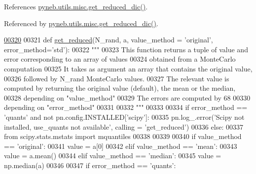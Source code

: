 References \hyperlink{misc_8py_source_l00370}{pyneb.\-utils.\-misc.\-get\-\_\-reduced\-\_\-dic()}.



Referenced by \hyperlink{misc_8py_source_l00370}{pyneb.\-utils.\-misc.\-get\-\_\-reduced\-\_\-dic()}.


\begin{DoxyCode}
\hypertarget{namespacepyneb_1_1utils_1_1misc_l00320}{}\hyperlink{namespacepyneb_1_1utils_1_1misc_ae69de9c9e8f8bde114b8edd326f3b993}{00320} 
00321 \textcolor{keyword}{def }\hyperlink{namespacepyneb_1_1utils_1_1misc_ae69de9c9e8f8bde114b8edd326f3b993}{get\_reduced}(N\_rand, a, value\_method = 'original', error\_method='std'):
00322     \textcolor{stringliteral}{"""}
00323 \textcolor{stringliteral}{    This function returns a tuple of value and error corresponding to an array of values }
00324 \textcolor{stringliteral}{        obtained from a MonteCarlo computation}
00325 \textcolor{stringliteral}{    It takes as argument an array that contains the original value, }
00326 \textcolor{stringliteral}{        followed by N\_rand MonteCarlo values.}
00327 \textcolor{stringliteral}{    The relevant value is computed by returning the original value (default), the mean or the median, }
00328 \textcolor{stringliteral}{        depending on "value\_method"}
00329 \textcolor{stringliteral}{    The errors are computed by 68%
00330 \textcolor{stringliteral}{        depending on "error\_method"}
00331 \textcolor{stringliteral}{    }
00332 \textcolor{stringliteral}{    """}
00333 
00334     \textcolor{keywordflow}{if} error\_method == \textcolor{stringliteral}{'quants'} \textcolor{keywordflow}{and} \textcolor{keywordflow}{not} pn.config.INSTALLED[\textcolor{stringliteral}{'scipy'}]:
00335         pn.log\_.error(\textcolor{stringliteral}{'Scipy not installed, use\_quants not available'}, calling = \textcolor{stringliteral}{'get\_reduced'})
00336     \textcolor{keywordflow}{else}:
00337         \textcolor{keyword}{from} scipy.stats.mstats \textcolor{keyword}{import} mquantiles
00338     
00339     
00340     \textcolor{keywordflow}{if} value\_method == \textcolor{stringliteral}{'original'}:
00341         value = a[0]
00342     \textcolor{keywordflow}{elif} value\_method == \textcolor{stringliteral}{'mean'}:
00343         value = a.mean()
00344     \textcolor{keywordflow}{elif} value\_method == \textcolor{stringliteral}{'median'}:
00345         value = np.median(a)
00346     
00347     \textcolor{keywordflow}{if} error\_method == \textcolor{stringliteral}{'quants'}:
}
\end{DoxyCode}

